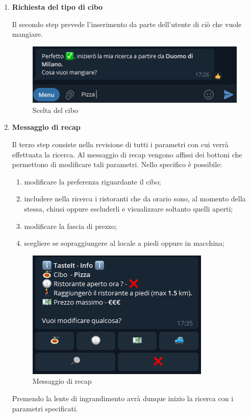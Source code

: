 \documentclass[a4paper, 12pt]{article}
\begin{document}
\begin{enumerate}
		\item \textbf{Richiesta del tipo di cibo}
		
		Il secondo step prevede l'inserimento da parte dell'utente di ciò che vuole mangiare.
		\begin{figure}[!htb]
			\centering
			\includegraphics[scale=0.9]{cercaCommand_foodChoice.png}
			\caption{Scelta del cibo}
		\end{figure}
	
		\item \textbf{Messaggio di recap}
		
		Il terzo step consiste nella revisione di tutti i parametri con cui verrà effettuata la ricerca.
		Al messaggio di recap vengono affissi dei bottoni che permettono di modificare tali parametri. Nello specifico è possibile:
		\begin{enumerate}
			\item modificare la preferenza riguardante il cibo;
			\item includere nella ricerca i ristoranti che da orario sono, al momento della stessa, chiusi oppure escluderli e visualizzare soltanto quelli aperti;
			\item modificare la fascia di prezzo;
			\item scegliere se sopraggiungere al locale a piedi oppure in macchina;
		\end{enumerate}
		\begin{figure}[!htb]
			\centering
			\includegraphics[scale=0.9]{cercaCommand_recapMsg.png}
			\caption{Messaggio di recap}
		\end{figure}
		Premendo la lente di ingrandimento avrà dunque inizio la ricerca con i parametri specificati.
		

\end{enumerate}
\end{document}
